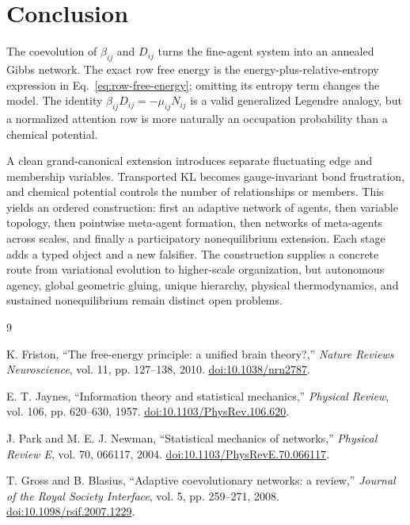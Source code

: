 \documentclass[11pt,letterpaper]{article}
\begin{document}
\section{Conclusion}

The coevolution of $\beta_{ij}$ and $D_{ij}$ turns the fine-agent system into an annealed Gibbs network.  The exact row free energy is the energy-plus-relative-entropy expression in Eq.~\eqref{eq:row-free-energy}; omitting its entropy term changes the model.  The identity $\beta_{ij}D_{ij}=-\mu_{ij}N_{ij}$ is a valid generalized Legendre analogy, but a normalized attention row is more naturally an occupation probability than a chemical potential.

A clean grand-canonical extension introduces separate fluctuating edge and membership variables.  Transported KL becomes gauge-invariant bond frustration, and chemical potential controls the number of relationships or members.  This yields an ordered construction: first an adaptive network of agents, then variable topology, then pointwise meta-agent formation, then networks of meta-agents across scales, and finally a participatory nonequilibrium extension.  Each stage adds a typed object and a new falsifier.  The construction supplies a concrete route from variational evolution to higher-scale organization, but autonomous agency, global geometric gluing, unique hierarchy, physical thermodynamics, and sustained nonequilibrium remain distinct open problems.

\begin{thebibliography}{9}

K. Friston,
``The free-energy principle: a unified brain theory?,''
\emph{Nature Reviews Neuroscience}, vol. 11, pp. 127--138, 2010.
\href{https://doi.org/10.1038/nrn2787}{doi:10.1038/nrn2787}.

E. T. Jaynes,
``Information theory and statistical mechanics,''
\emph{Physical Review}, vol. 106, pp. 620--630, 1957.
\href{https://doi.org/10.1103/PhysRev.106.620}{doi:10.1103/PhysRev.106.620}.

J. Park and M. E. J. Newman,
``Statistical mechanics of networks,''
\emph{Physical Review E}, vol. 70, 066117, 2004.
\href{https://doi.org/10.1103/PhysRevE.70.066117}{doi:10.1103/PhysRevE.70.066117}.

T. Gross and B. Blasius,
``Adaptive coevolutionary networks: a review,''
\emph{Journal of the Royal Society Interface}, vol. 5, pp. 259--271, 2008.
\href{https://doi.org/10.1098/rsif.2007.1229}{doi:10.1098/rsif.2007.1229}.

\end{thebibliography}
\end{document}
